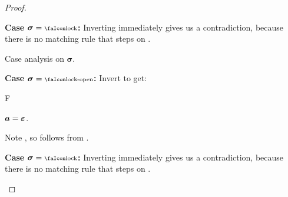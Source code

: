 \documentclass[a4paper,names,dvipsnames]{article}
\begin{document}
\begin{proof}
\begin{description}
\begin{description}
\begin{description}
            \item \textbf{Case }$\bm{\sigma}=\lock$\textbf{:}
              Inverting  immediately gives us a contradiction, because there is no matching rule that steps on \lock.
          \end{description}

          Case analysis on $\bm{\sigma}$.
          \begin{description}
            \item \textbf{Case }$\bm{\sigma}=\unlock$\textbf{:}
              Invert  to get:
              \begin{passumptions}{F}
                \item $\bm{a}=\bm{\varepsilon}$.
              \end{passumptions}
              Note , so  follows from .

            \item \textbf{Case }$\bm{\sigma}=\lock$\textbf{:}
              Inverting  immediately gives us a contradiction, because there is no matching rule that steps on \lock.
          \end{description}
      \end{description}
  \end{description}
\end{proof}
\end{document}
